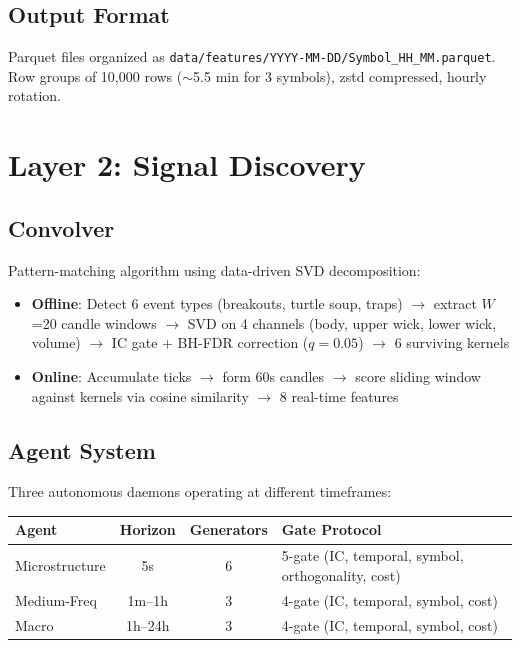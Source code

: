 \documentclass[11pt,a4paper]{article}
\begin{document}
\subsection{Output Format}

Parquet files organized as \texttt{data/features/YYYY-MM-DD/Symbol\_HH\_MM.parquet}. Row groups of 10,000 rows ($\sim$5.5 min for 3 symbols), zstd compressed, hourly rotation.

\section{Layer 2: Signal Discovery}

\subsection{Convolver}

Pattern-matching algorithm using data-driven SVD decomposition:

\begin{itemize}
    \item \textbf{Offline}: Detect 6 event types (breakouts, turtle soup, traps) $\to$ extract $W$=20 candle windows $\to$ SVD on 4 channels (body, upper wick, lower wick, volume) $\to$ IC gate + BH-FDR correction ($q=0.05$) $\to$ 6 surviving kernels
    \item \textbf{Online}: Accumulate ticks $\to$ form 60s candles $\to$ score sliding window against kernels via cosine similarity $\to$ 8 real-time features
\end{itemize}

\subsection{Agent System}

Three autonomous daemons operating at different timeframes:

\begin{longtable}{|l|c|c|l|}
\hline
\textbf{Agent} & \textbf{Horizon} & \textbf{Generators} & \textbf{Gate Protocol} \\
\hline
Microstructure & 5s & 6 & 5-gate (IC, temporal, symbol, orthogonality, cost) \\
Medium-Freq & 1m--1h & 3 & 4-gate (IC, temporal, symbol, cost) \\
Macro & 1h--24h & 3 & 4-gate (IC, temporal, symbol, cost) \\
\hline
\end{longtable}
\end{document}
